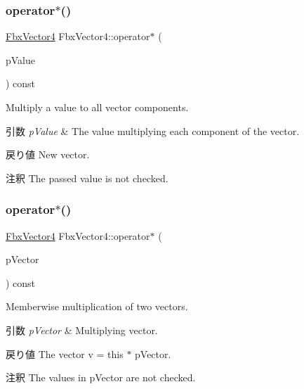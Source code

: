 \subsubsection{\texorpdfstring{operator$\ast$()}{operator*()}\hspace{0.1cm}{\footnotesize\ttfamily [1/2]}}
{\footnotesize\ttfamily \hyperlink{class_fbx_vector4}{Fbx\+Vector4} Fbx\+Vector4\+::operator$\ast$ (\begin{DoxyParamCaption}\item[{double}]{p\+Value }\end{DoxyParamCaption}) const}

Multiply a value to all vector components. 
\begin{DoxyParams}{引数}
{\em p\+Value} & The value multiplying each component of the vector. \\
\hline
\end{DoxyParams}
\begin{DoxyReturn}{戻り値}
New vector. 
\end{DoxyReturn}
\begin{DoxyRemark}{注釈}
The passed value is not checked. 
\end{DoxyRemark}
\mbox{\label{class_fbx_vector4_ab125b0b39c89ef465e68502b66d20a2a}} 
\subsubsection{\texorpdfstring{operator$\ast$()}{operator*()}\hspace{0.1cm}{\footnotesize\ttfamily [2/2]}}
{\footnotesize\ttfamily \hyperlink{class_fbx_vector4}{Fbx\+Vector4} Fbx\+Vector4\+::operator$\ast$ (\begin{DoxyParamCaption}\item[{const \hyperlink{class_fbx_vector4}{Fbx\+Vector4} \&}]{p\+Vector }\end{DoxyParamCaption}) const}

Memberwise multiplication of two vectors. 
\begin{DoxyParams}{引数}
{\em p\+Vector} & Multiplying vector. \\
\hline
\end{DoxyParams}
\begin{DoxyReturn}{戻り値}
The vector v\textquotesingle{} = this $\ast$ p\+Vector. 
\end{DoxyReturn}
\begin{DoxyRemark}{注釈}
The values in p\+Vector are not checked. 
\end{DoxyRemark}
\mbox{\label{class_fbx_vector4_ab5d9688dc2682376c623db6d4b0edcd9}} 
